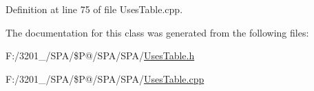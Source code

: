 Definition at line 75 of file Uses\-Table.\-cpp.



The documentation for this class was generated from the following files\-:\begin{DoxyCompactItemize}
\item 
F\-:/3201\-\_/\-S\-P\-A/\$\-P@/\-S\-P\-A/\-S\-P\-A/\hyperlink{_uses_table_8h}{Uses\-Table.\-h}\item 
F\-:/3201\-\_/\-S\-P\-A/\$\-P@/\-S\-P\-A/\-S\-P\-A/\hyperlink{_uses_table_8cpp}{Uses\-Table.\-cpp}\end{DoxyCompactItemize}
